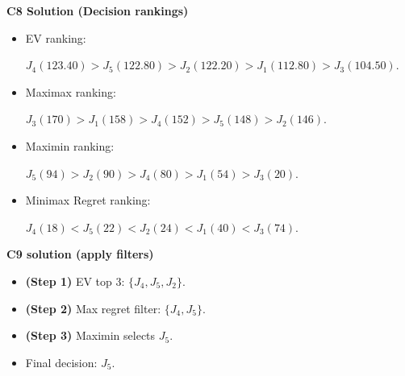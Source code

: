 \begin{ExamProblems}
		\textbf{C8 Solution (Decision rankings)}\par
		\begin{itemize}
			\item EV ranking: \par $J_4(123.40)>J_5(122.80)>J_2(122.20)>J_1(112.80)>J_3(104.50)$.
			\item Maximax ranking:\par $J_3(170)>J_1(158)>J_4(152)>J_5(148)>J_2(146)$.
			\item Maximin ranking: \par $J_5(94)>J_2(90)>J_4(80)>J_1(54)>J_3(20)$.
			\item Minimax Regret ranking:\par $J_4(18)<J_5(22)<J_2(24)<J_1(40)<J_3(74)$.
		\end{itemize}
		
		\textbf{C9 solution (apply filters)}\par
		\begin{itemize}
			\item \textbf{(Step 1)} EV top 3: $\{J_4,J_5,J_2\}$.
			\item \textbf{(Step 2)} Max regret filter: $\{J_4,J_5\}$.
			\item \textbf{(Step 3)} Maximin selects $J_5$.
			\item Final decision: $J_5$.
		\end{itemize}
		
		\end{ExamProblems}

